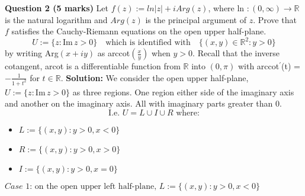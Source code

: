 \documentclass[12pt]{article}
\begin{document}
\linebreak
\noindent \textbf{Question 2 (5 marks)} Let \( f(z) := ln|z| + iArg(z)\), where ln \( : (0, \infty) \to \mathbb{R}\) is the natural logarithm and \(Arg(z)\) is the principal argument of \(z\). Prove that \(f\) satisfies the Cauchy-Riemann equations on the open upper half-plane.
\[
U := \{z: \text{Im}\,z > 0\}\quad \text{which is identified with} \quad \{\left(x,y\right) \in \mathbb{R}^2:y > 0\}
\]
\noindent by writing Arg\(\left(x + iy\right)\) as arccot\(\left(\frac{x}{y}\right)\) when \(y > 0\). Recall that the inverse cotangent, arcot is a differentiable function from \(\mathbb{R}\) into \(\left(0,\pi\right)\) with arccot\(^{\prime}\)(t) = \(-\frac{1}{1+t^2}\) for \(t \in \mathbb{R}\).\newline
\linebreak
\textbf{Solution:} \newline 
\linebreak
We consider the open upper half-plane, \(U := \{z: \text{Im}\,z > 0\}\) as three regions. One region either side of the imaginary axis and another on the imaginary axis. All with imaginary parts greater than 0.\newline
\[
\text{I.e. }U = L \cup I \cup R \text{ where:}
\]
\begin{itemize}
    \item  \(L := \{\left(x,y\right): y > 0, x < 0\}\)
    \item \(R  := \{\left(x,y\right): y > 0, x > 0\}\)
    \item \(I := \{\left(x,y\right): y > 0, x =0\}\)
\end{itemize}
\[\]
\(\textit{Case 1: } \text{on the open upper left half-plane, } L := \{\left(x,y\right): y > 0, x < 0\}\)
\end{document}
